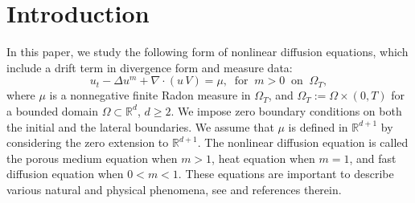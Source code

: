 \documentclass{amsart}
\numberwithin{equation}{section}
\begin{document}
\begin{abstract}
We consider nonlinear drift-diffusion equations (both porous medium equations and fast diffusion equations) with measure data. We establish the existence of nonnegative weak solutions satisfying gradient estimates, provided that the drift term belongs to a sub-scaling class relevant to the $L^1$ space. When the drift is divergence-free, this requirement can be relaxed: the drift may belong to a class that is supercritical with respect to $L^1$-scaling class, and the admissible range of the diffusion exponent $m$ is enlarged as well. By handling both the measure data and the drift, we obtain a new type of energy estimate. We also discuss sharpness by constructing counterexamples showing that the general-drift range cannot be improved under the corresponding integrability scale without the divergence-free cancellation. As an application, we construct weak solutions for a specific type of nonlinear diffusion equation with measure data coupled to the incompressible Navier-Stokes equations.
\end{abstract}
\maketitle





\section{Introduction}
In this paper, we study the following form of nonlinear diffusion equations, which include a drift term in divergence form and measure data:
\begin{equation}\label{PME}
	u_t - \Delta u^m + \nabla \cdot \left( u \, V \right)= \mu, \ \text{ for } \  m>0 \ \text{ on } \ \Omega_{T},
\end{equation}
where \(\mu\) is a nonnegative finite Radon measure in $\Omega_T$, and \(\Omega_T := \Omega \times (0,T)\) for a bounded domain \(\Omega \subset \mathbb{R}^d\), \(d \geq 2\). We impose zero boundary conditions on both the initial and the lateral boundaries. We assume that $\mu$ is defined in $\mathbb{R}^{d+1}$ by considering the zero extension to $\mathbb{R}^{d+1}$.
The nonlinear diffusion equation is called the porous medium equation when $m>1$, heat equation when $m=1$, and fast diffusion equation when $0<m<1$. These equations are important to describe various natural and physical phenomena, see \cite{DK07, DGV12, Vaz06, Vaz07} and references therein.
\end{document}
